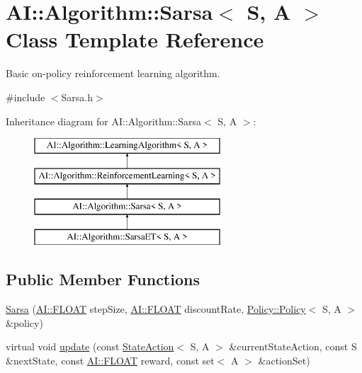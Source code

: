 \hypertarget{classAI_1_1Algorithm_1_1Sarsa}{\section{A\-I\-:\-:Algorithm\-:\-:Sarsa$<$ S, A $>$ Class Template Reference}
\label{classAI_1_1Algorithm_1_1Sarsa}
}


Basic on-\/policy reinforcement learning algorithm.  




{\ttfamily \#include $<$Sarsa.\-h$>$}

Inheritance diagram for A\-I\-:\-:Algorithm\-:\-:Sarsa$<$ S, A $>$\-:\begin{figure}[H]
\begin{center}
\leavevmode
\includegraphics[height=4.000000cm]{classAI_1_1Algorithm_1_1Sarsa}
\end{center}
\end{figure}
\subsection*{Public Member Functions}
\begin{DoxyCompactItemize}
\item 
\hyperlink{classAI_1_1Algorithm_1_1Sarsa_a02dae564a53ea2284a23d047a8998fca}{Sarsa} (\hyperlink{namespaceAI_a41b74884a20833db653dded3918e05c3}{A\-I\-::\-F\-L\-O\-A\-T} step\-Size, \hyperlink{namespaceAI_a41b74884a20833db653dded3918e05c3}{A\-I\-::\-F\-L\-O\-A\-T} discount\-Rate, \hyperlink{classAI_1_1Algorithm_1_1Policy_1_1Policy}{Policy\-::\-Policy}$<$ S, A $>$ \&policy)
\item 
virtual void \hyperlink{classAI_1_1Algorithm_1_1Sarsa_ae1d62478d3e31cace3fb594e05f83d1c}{update} (const \hyperlink{classAI_1_1StateAction}{State\-Action}$<$ S, A $>$ \&current\-State\-Action, const S \&next\-State, const \hyperlink{namespaceAI_a41b74884a20833db653dded3918e05c3}{A\-I\-::\-F\-L\-O\-A\-T} reward, const set$<$ A $>$ \&action\-Set)
\end{DoxyCompactItemize}
